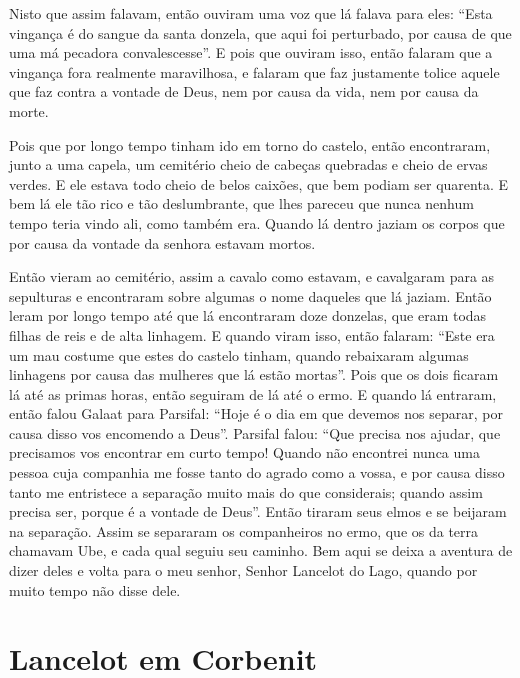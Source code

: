 Nisto que assim falavam, então ouviram uma voz que lá falava para eles: “Esta
vingança é do sangue da santa donzela, que aqui foi perturbado, por causa de
que uma má pecadora convalescesse”. E pois que ouviram isso, então
falaram que a vingança fora realmente maravilhosa, e falaram que faz justamente
tolice aquele que faz contra a vontade de Deus, nem por causa da vida, nem por
causa da morte.

Pois que por longo tempo tinham ido em torno do castelo, então encontraram,
junto a uma capela, um cemitério cheio de cabeças quebradas e cheio de ervas
verdes. E ele estava todo cheio de belos caixões, que bem podiam ser quarenta.
E bem lá ele tão rico e tão deslumbrante, que lhes pareceu que nunca nenhum
tempo teria vindo ali, como também era. Quando lá dentro jaziam os corpos que
por causa da vontade da senhora estavam mortos.

Então vieram ao cemitério, assim a cavalo como estavam, e cavalgaram para as
sepulturas e encontraram sobre algumas o nome daqueles que lá jaziam. Então
leram por longo tempo até que lá encontraram doze donzelas, que eram todas
filhas de reis e de alta linhagem. E quando viram isso, então falaram: “Este
era um mau costume que estes do castelo tinham, quando rebaixaram algumas
linhagens por causa das mulheres que lá estão mortas”. Pois que os dois ficaram
lá até as primas horas, então seguiram de lá até o ermo. E quando lá entraram,
então falou Galaat para Parsifal: “Hoje é o dia em que devemos nos separar,
por causa disso vos encomendo a Deus”. Parsifal falou: “Que precisa nos ajudar,
que precisamos vos encontrar em curto tempo! Quando não encontrei nunca uma
pessoa cuja companhia me fosse tanto do agrado como a vossa, e por causa disso
tanto me entristece a separação muito mais do que considerais; quando assim
precisa ser, porque é a vontade de Deus”. Então tiraram seus elmos e se
beijaram na separação. Assim se separaram os companheiros no ermo, que os da
terra chamavam Ube, e cada qual seguiu seu caminho. Bem aqui se deixa
a aventura de dizer deles e volta para o meu senhor, Senhor Lancelot do Lago,
quando por muito tempo não disse dele. 

\chapter{Lancelot em Corbenit}

